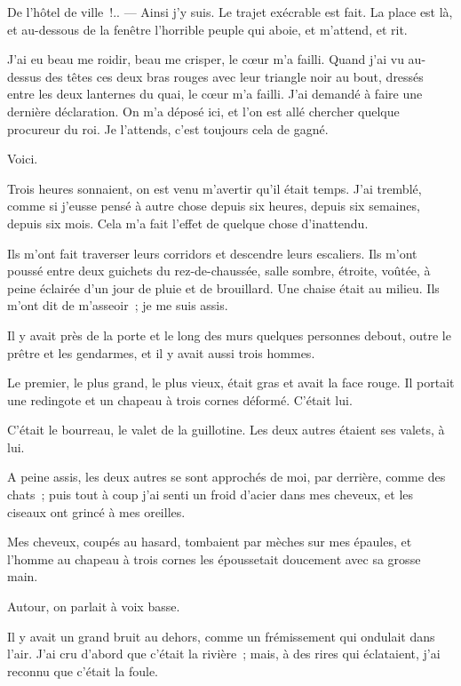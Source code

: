 \documentclass[french,twoside]{book} %
\newcommand{\dateline}[1]{\medskip{\RaggedLeft{#1}\par}\bigskip}
\begin{document}
\dateline{D’une chambre de l’hôtel de ville.}
\noindent De l’hôtel de ville !.. — Ainsi j’y suis. Le trajet exécrable est fait. La place est là, et au-dessous de la fenêtre l’horrible peuple qui aboie, et m’attend, et rit.\par
J’ai eu beau me roidir, beau me crisper, le cœur m’a failli. Quand j’ai vu au-dessus des têtes ces deux bras rouges avec leur triangle noir au bout, dressés entre les deux lanternes du quai, le cœur m’a failli. J’ai demandé à faire une dernière déclaration. On m’a déposé ici, et l’on est allé chercher quelque procureur du roi. Je l’attends, c’est toujours cela de gagné.\par
Voici.\par
Trois heures sonnaient, on est venu m’avertir qu’il était temps. J’ai tremblé, comme si j’eusse pensé à autre chose depuis six heures, depuis six semaines, depuis six mois. Cela m’a fait l’effet de quelque chose d’inattendu.\par
Ils m’ont fait traverser leurs corridors et descendre  leurs escaliers. Ils m’ont poussé entre deux guichets du rez-de-chaussée, salle sombre, étroite, voûtée, à peine éclairée d’un jour de pluie et de brouillard. Une chaise était au milieu. Ils m’ont dit de m’asseoir ; je me suis assis.\par
Il y avait près de la porte et le long des murs quelques personnes debout, outre le prêtre et les gendarmes, et il y avait aussi trois hommes.\par
Le premier, le plus grand, le plus vieux, était gras et avait la face rouge. Il portait une redingote et un chapeau à trois cornes déformé. C’était lui.\par
C’était le bourreau, le valet de la guillotine. Les deux autres étaient ses valets, à lui.\par
A peine assis, les deux autres se sont approchés de moi, par derrière, comme des chats ; puis tout à coup j’ai senti un froid d’acier dans mes cheveux, et les ciseaux ont grincé à mes oreilles.\par
Mes cheveux, coupés au hasard, tombaient par mèches sur mes épaules, et l’homme au chapeau à trois cornes les époussetait doucement avec sa grosse main.\par
Autour, on parlait à voix basse.\par
Il y avait un grand bruit au dehors, comme un frémissement qui ondulait dans l’air. J’ai cru d’abord que c’était la rivière ; mais, à des rires qui éclataient, j’ai reconnu que c’était la foule.\par
\end{document}

